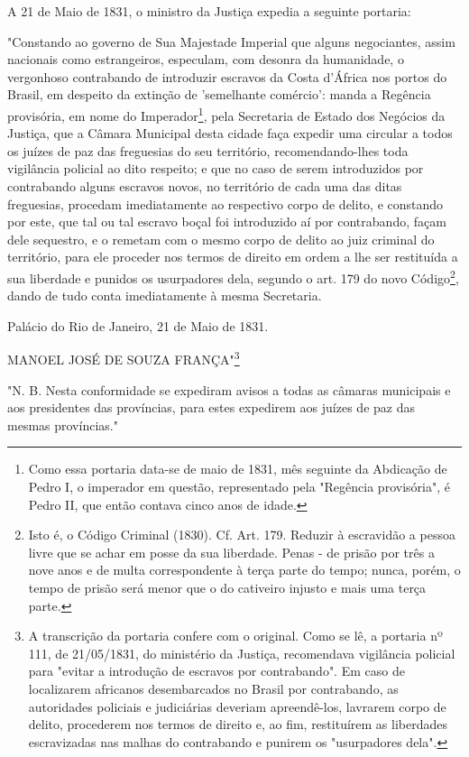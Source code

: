 A 21 de Maio de 1831, o ministro da Justiça expedia a seguinte portaria:

"Constando ao governo de Sua Majestade Imperial que alguns negociantes,
assim nacionais como estrangeiros, especulam, com desonra da humanidade,
o vergonhoso contrabando de introduzir escravos da Costa d'África nos
portos do Brasil, em despeito da extinção de 'semelhante comércio':
manda a Regência provisória, em nome do Imperador\footnote{Como essa
  portaria data-se de maio de 1831, mês seguinte da Abdicação de Pedro
  I, o imperador em questão, representado pela "Regência provisória", é
  Pedro II, que então contava cinco anos de idade.}, pela Secretaria de
Estado dos Negócios da Justiça, que a Câmara Municipal desta cidade faça
expedir uma circular a todos os juízes de paz das freguesias do seu
território, recomendando-lhes toda vigilância policial ao dito respeito;
e que no caso de serem introduzidos por contrabando alguns escravos
novos, no território de cada uma das ditas freguesias, procedam
imediatamente ao respectivo corpo de delito, e constando por este, que
tal ou tal escravo boçal foi introduzido aí por contrabando, façam dele
sequestro, e o remetam com o mesmo corpo de delito ao juiz criminal do
território, para ele proceder nos termos de direito em ordem a lhe ser
restituída a sua liberdade e punidos os usurpadores dela, segundo o art.
179 do novo Código\footnote{Isto é, o Código Criminal (1830). Cf. Art.
  179. Reduzir à escravidão a pessoa livre que se achar em posse da sua
  liberdade. Penas - de prisão por três a nove anos e de multa
  correspondente à terça parte do tempo; nunca, porém, o tempo de prisão
  será menor que o do cativeiro injusto e mais uma terça parte.}, dando
de tudo conta imediatamente à mesma Secretaria.

Palácio do Rio de Janeiro, 21 de Maio de 1831.

MANOEL JOSÉ DE SOUZA FRANÇA"\footnote{A transcrição da portaria
  confere com o original. Como se lê, a portaria nº 111, de 21/05/1831,
  do ministério da Justiça, recomendava vigilância policial para "evitar
  a introdução de escravos por contrabando". Em caso de localizarem
  africanos desembarcados no Brasil por contrabando, as autoridades
  policiais e judiciárias deveriam apreendê-los, lavrarem corpo de
  delito, procederem nos termos de direito e, ao fim, restituírem as
  liberdades escravizadas nas malhas do contrabando e punirem os
  "usurpadores dela".}

"N. B. Nesta conformidade se expediram avisos a todas as câmaras
municipais e aos presidentes das províncias, para estes expedirem aos
juízes de paz das mesmas províncias."

